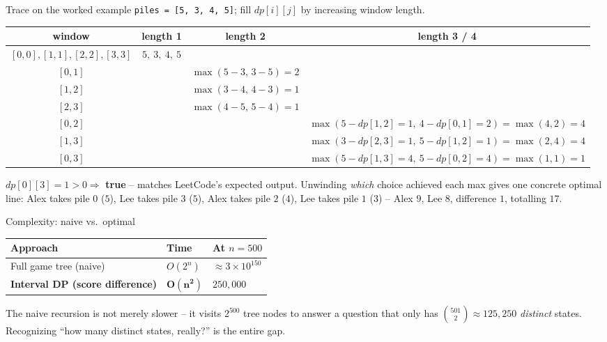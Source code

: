 \documentclass[11pt,aspectratio=169]{beamer}
\begin{document}
\begin{frame}{Trace on the worked example}
  \scriptsize
  \texttt{piles = [5, 3, 4, 5]}; fill $dp[i][j]$ by increasing window length.
  \begin{center}
  \begin{tabular}{@{}c c c c@{}}
    \toprule
    window & length 1 & length 2 & length 3 / 4 \\
    \midrule
    $[0,0],[1,1],[2,2],[3,3]$ & $5,\ 3,\ 4,\ 5$ & & \\
    $[0,1]$ & & $\max(5{-}3,\,3{-}5)=2$ & \\
    $[1,2]$ & & $\max(3{-}4,\,4{-}3)=1$ & \\
    $[2,3]$ & & $\max(4{-}5,\,5{-}4)=1$ & \\
    $[0,2]$ & & & $\max(5{-}dp[1,2]{=}1,\ 4{-}dp[0,1]{=}2)=\max(4,2)=4$ \\
    $[1,3]$ & & & $\max(3{-}dp[2,3]{=}1,\ 5{-}dp[1,2]{=}1)=\max(2,4)=4$ \\
    $[0,3]$ & & & $\max(5{-}dp[1,3]{=}4,\ 5{-}dp[0,2]{=}4)=\max(1,1)=1$ \\
    \bottomrule
  \end{tabular}
  \end{center}
  $dp[0][3] = 1 > 0 \Rightarrow$ \textbf{true} -- matches LeetCode's expected output.
  Unwinding \emph{which} choice achieved each max gives one concrete optimal line: Alex
  takes pile $0$ ($5$), Lee takes pile $3$ ($5$), Alex takes pile $2$ ($4$), Lee takes
  pile $1$ ($3$) -- Alex $9$, Lee $8$, difference $1$, totalling $17$. \checkmark
\end{frame}

\begin{frame}{Complexity: naive vs.\ optimal}
  \begin{center}
  \begin{tabular}{@{}lll@{}}
    \toprule
    Approach & Time & At $n=500$ \\
    \midrule
    Full game tree (naive) & $O(2^n)$ & $\approx 3\times 10^{150}$ \\
    \textbf{Interval DP (score difference)} & $\boldsymbol{O(n^2)}$ & $250{,}000$ \\
    \bottomrule
  \end{tabular}
  \end{center}
  The naive recursion is not merely slower -- it visits $2^{500}$ tree nodes to answer
  a question that only has $\binom{501}{2}\approx 125{,}250$ \emph{distinct} states.
  Recognizing ``how many distinct states, really?'' is the entire gap.
\end{frame}
\end{document}
